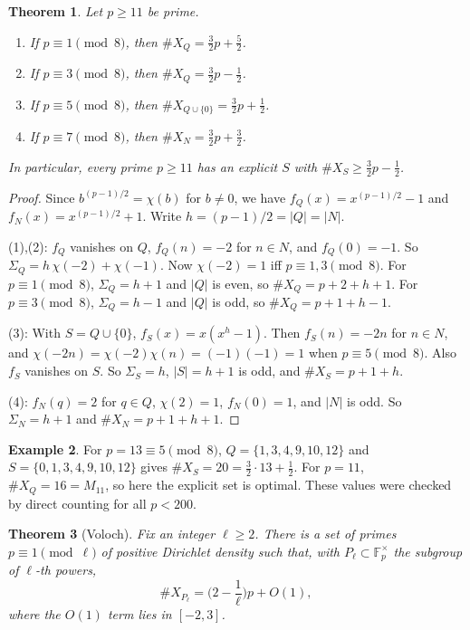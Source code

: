 \documentclass[12pt,letterpaper]{article}
\newtheorem{theorem}{Theorem}[section]
\theoremstyle{definition}
\newtheorem{example}[theorem]{Example}
\theoremstyle{remark}
\numberwithin{equation}{section}
\newcommand{\Fp}{\mathbb{F}_p}
\newcommand{\X}{\#X}
\begin{document}
\begin{theorem}\label{thm:voloch}
Let $p\ge 11$ be prime.
\begin{enumerate}
\item If $p\equiv1\pmod 8$, then $\X_Q=\frac32p+\frac52$.
\item If $p\equiv3\pmod 8$, then $\X_Q=\frac32p-\frac12$.
\item If $p\equiv5\pmod 8$, then $\X_{Q\cup\{0\}}=\frac32p+\frac12$.
\item If $p\equiv7\pmod 8$, then $\X_N=\frac32p+\frac32$.
\end{enumerate}
In particular, every prime $p\ge11$ has an explicit $S$ with $\X_S\ge\frac32p-\frac12$.
\end{theorem}

\begin{proof}
Since $b^{(p-1)/2}=\chi(b)$ for $b\ne0$, we have $f_Q(x)=x^{(p-1)/2}-1$ and
$f_N(x)=x^{(p-1)/2}+1$. Write $h=(p-1)/2=|Q|=|N|$.

(1),(2): $f_Q$ vanishes on $Q$, $f_Q(n)=-2$ for $n\in N$, and $f_Q(0)=-1$. So
$\Sigma_Q=h\,\chi(-2)+\chi(-1)$. Now $\chi(-2)=1$ iff $p\equiv1,3\pmod8$. For
$p\equiv1\pmod8$, $\Sigma_Q=h+1$ and $|Q|$ is even, so $\X_Q=p+2+h+1$. For
$p\equiv3\pmod8$, $\Sigma_Q=h-1$ and $|Q|$ is odd, so $\X_Q=p+1+h-1$.

(3): With $S=Q\cup\{0\}$, $f_S(x)=x(x^h-1)$. Then $f_S(n)=-2n$ for $n\in N$, and
$\chi(-2n)=\chi(-2)\chi(n)=(-1)(-1)=1$ when $p\equiv5\pmod 8$. Also $f_S$ vanishes
on $S$. So $\Sigma_S=h$, $|S|=h+1$ is odd, and $\X_S=p+1+h$.

(4): $f_N(q)=2$ for $q\in Q$, $\chi(2)=1$, $f_N(0)=1$, and $|N|$ is odd. So
$\Sigma_N=h+1$ and $\X_N=p+1+h+1$.
\end{proof}

\begin{example}
For $p=13\equiv5\pmod 8$, $Q=\{1,3,4,9,10,12\}$ and $S=\{0,1,3,4,9,10,12\}$ gives
$\X_S=20=\frac32\cdot13+\frac12$. For $p=11$, $\X_Q=16=M_{11}$, so here the explicit
set is optimal. These values were checked by direct counting for all $p<200$.
\end{example}

\begin{theorem}[Voloch]\label{thm:chebotarev}
Fix an integer $\ell\ge2$. There is a set of primes $p\equiv1\pmod\ell$ of positive
Dirichlet density such that, with $P_\ell\subset\Fp^\times$ the subgroup of $\ell$-th
powers,
\[
\X_{P_\ell}=\Big(2-\frac1\ell\Big)p+O(1),
\]
where the $O(1)$ term lies in $[-2,3]$.
\end{theorem}
\end{document}
